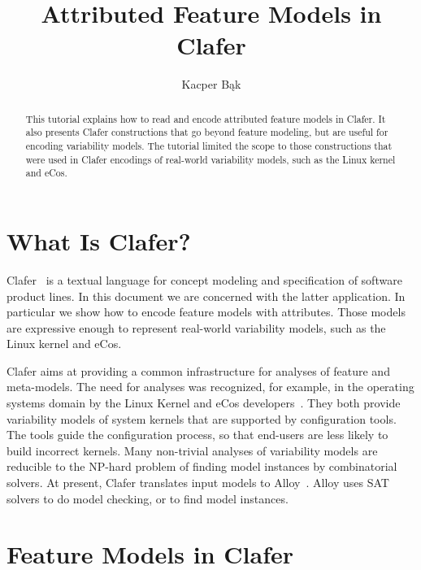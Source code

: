 \documentclass{llncs}
\begin{document}
\title{Attributed Feature Models in Clafer}

\author{Kacper B\k{a}k}


\maketitle

\begin{abstract}
This tutorial explains how to read and encode attributed feature models in Clafer. It also presents Clafer constructions that go beyond feature modeling, but are useful for encoding variability models. The tutorial limited the scope to those constructions that were used in Clafer encodings of real-world variability models, such as the Linux kernel and eCos.
\end{abstract}

\section{What Is Clafer?}
Clafer~\cite{bak:clafer:2010} is a textual language for concept modeling and specification of software product lines. In this document we are concerned with the latter application. In particular we show how to encode feature models with attributes. Those models are expressive enough to represent real-world variability models, such as the Linux kernel and eCos.

Clafer aims at providing a common infrastructure for analyses of feature and meta-models. The need for analyses was recognized, for example, in the operating systems domain by the Linux Kernel and eCos developers~\cite{berger:varmodel:2010}. They both provide variability models of system kernels that are supported by configuration tools. The tools guide the configuration process, so that end-users are less likely to build incorrect kernels. Many non-trivial analyses of variability models are reducible to the NP-hard problem of finding model instances by combinatorial solvers. At present, Clafer translates input models to Alloy~\cite{jackson:alloy:2006}. Alloy uses SAT solvers to do model checking, or to find model instances. 

\section{Feature Models in Clafer}
\end{document}
